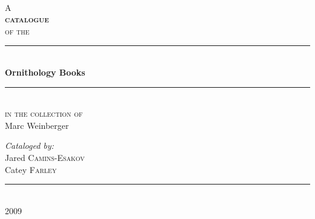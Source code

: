 \begin{titlepage}
 
\begin{center}
 
 
~\\[1cm]
{\small A}\\[0.5cm]

\textsc{\huge\bfseries catalogue}\\[0.5cm]
 
\textsc{\small of the}\\[0.5cm]
 
 
\rule{\linewidth}{0.5mm}\\[0.4cm]
{ \huge \bfseries Ornithology Books}\\[0.4cm]

\rule{\linewidth}{0.5mm}\\[0.5cm]

\textsc{\small in the collection of}\\[0.5cm]

{\selectfont\LARGE Marc Weinberger}\\[1.5cm]
 
\begin{flushleft} \large
\emph{Cataloged by:}\\
Jared \textsc{Camins-Esakov}\\
Catey \textsc{Farley}\\
\end{flushleft}
 
\vfill
 
\rule{6cm}{0.25mm}\\[0.2cm]

{\large 2009}
 
\end{center}
 
\end{titlepage}


